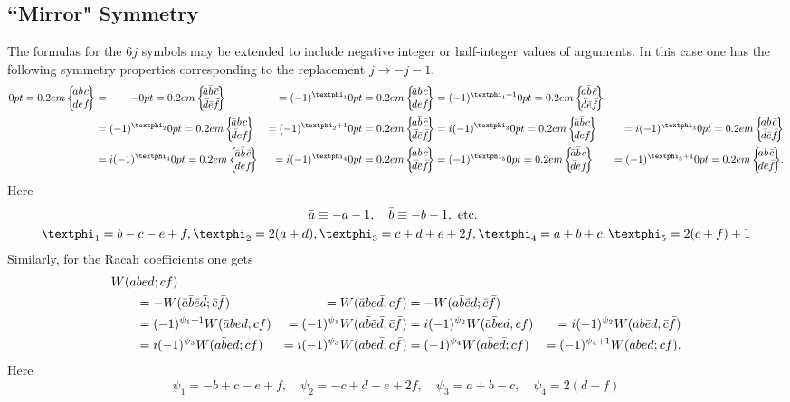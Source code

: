 \subsection{``Mirror" Symmetry}\label{sec:9.4.4}
The formulas for the $6 j$ symbols may be extended to include negative integer or half-integer values of arguments. In this case one has the following symmetry properties \cite{ref045} corresponding to the replacement $j \rightarrow-j-1$,
\begin{alignat}{4}
 \sixj{a}{b}{c}{d}{e}{f}
&=\qquad-\sixj{\bar{a}}{\bar{b}}{\bar{c}}{\bar{d}}{\bar{e}}{\bar{f}}
&=(-1)^{\varphi_{1}}\sixj{\bar{a} }{ b }{ c}{d }{ e }{ f}
&=(-1)^{\varphi_{1}+1}\sixj{a }{ \bar{b}}{\bar{c}}{\bar{d}}{ \bar{e}}{\bar{f}}\notag\\
& =(-1)^{\varphi_{2}}\sixj{\bar{a} }{ b }{ c}{\bar{d} }{ e }{ f}
&=(-1)^{\varphi_{2}+1}\sixj{a }{ \bar{b} }{ \bar{c}}{\bar{d} }{ \bar{e} }{ \bar{f}}
&=i(-1)^{\varphi_{3}}\sixj{\bar{a}}{ \bar{b} }{c}{d }{ e }{ f}
&=i(-1)^{\varphi_{3}}\sixj{a }{ b}{ \bar{c} }{\bar{d} }{ \bar{e} }{\bar{f}}  \notag\\
& =i(-1)^{\varphi_{4}}\sixj{\bar{a}}{\bar{b}}{\bar{c}}{d}{e}{f}
&=i(-1)^{\varphi_{4}}\sixj{a}{b}{c}{\bar{d}}{\bar{e}}{\bar{f}}
&=(-1)^{\varphi_{5}}\sixj{\bar{a}}{\bar{b}}{c}{\bar{d}}{e}{f}
&=(-1)^{\varphi_{5}+1}\sixj{a}{b}{\bar{c}}{d}{\bar{e}}{\bar{f}} . \label{eq:9:4:8}
\end{alignat}
Here
\begin{gather}
\bar{a} \equiv-a-1, \quad \bar{b} \equiv-b-1, \text { etc. }  \notag\\
\varphi_{1}=b-c-e+f, \varphi_{2}=2(a+d), \varphi_{3}=c+d+e+2 f, \varphi_{4}=a+b+c, \varphi_{5}=2(c+f)+1 \label{eq:9:4:9}
\end{gather}
Similarly, for the Racah coefficients one gets
\begin{alignat}{4}
\MoveEqLeft{W(a b e d ; c f)}\notag\\
&=-W(\bar{a} \bar{b} \bar{e} \bar{d} ; \bar{c} \bar{f})&=W(\bar{a} b e \bar{d} ; c f)&=-W(a \bar{b} \bar{e} d ; \bar{c} \bar{f}) & \notag\\
&=(-1)^{\psi_{1}+1} W(\bar{a} b e d ; c f)&=(-1)^{\psi_{1}} W(a \bar{b} \bar{e} \bar{d} ; \bar{c} \bar{f})&=i(-1)^{\psi_{2}} W(\bar{a} \bar{b} e d ; c f)&=i(-1)^{\psi_{2}} W(a b \bar{e} d ; \bar{c} \bar{f})  \notag\\
&=i(-1)^{\psi_{3}} W(\bar{a} \bar{b} e d ; \bar{c} f)&=i(-1)^{\psi_{3}} W(a b \bar{e} \bar{d} ; c \bar{f})&=(-1)^{\psi_{4}} W(\bar{a} \bar{b} e \bar{d} ; c f)&=(-1)^{\psi_{4}+1} W(a b \bar{e} d ; \bar{c} f) . \label{eq:9:4:10}
\end{alignat}
Here
\begin{equation}
\psi_{1}=-b+c-e+f, \quad \psi_{2}=-c+d+e+2 f, \quad \psi_{3}=a+b-c, \quad \psi_{4}=2(d+f) \label{eq:9:4:11}
\end{equation}
